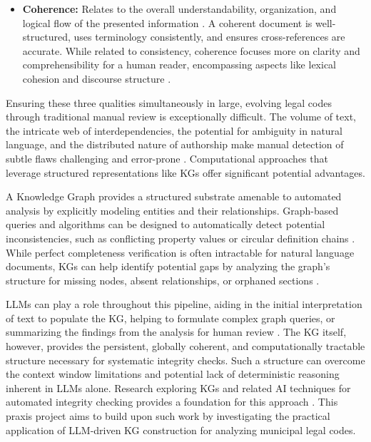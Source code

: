 \begin{itemize}
    \item \textbf{Coherence:} Relates to the overall understandability, organization, and logical flow of the presented information \parencite{RefWorks:RefID:44-wang2014short, RefWorks:RefID:14-shen2021evaluating}. A coherent document is well-structured, uses terminology consistently, and ensures cross-references are accurate. While related to consistency, coherence focuses more on clarity and comprehensibility for a human reader, encompassing aspects like lexical cohesion and discourse structure \parencite{RefWorks:RefID:44-wang2014short}.
\end{itemize}

Ensuring these three qualities simultaneously in large, evolving legal codes through traditional manual review is exceptionally difficult. The volume of text, the intricate web of interdependencies, the potential for ambiguity in natural language, and the distributed nature of authorship make manual detection of subtle flaws challenging and error-prone \parencite{RefWorks:RefID:68-beth2018bills}. Computational approaches that leverage structured representations like KGs offer significant potential advantages.

A Knowledge Graph provides a structured substrate amenable to automated analysis by explicitly modeling entities and their relationships. Graph-based queries and algorithms can be designed to automatically detect potential inconsistencies, such as conflicting property values or circular definition chains \parencite{RefWorks:RefID:77-tauqeer2022automated, RefWorks:RefID:24-brucker2019ontologies, RefWorks:RefID:19-schönberg2011verifying, RefWorks:RefID:23-weitl2006checking}. While perfect completeness verification is often intractable for natural language documents, KGs can help identify potential gaps by analyzing the graph's structure for missing nodes, absent relationships, or orphaned sections \parencite{RefWorks:RefID:151-rabbani2023extraction, RefWorks:RefID:152-rabbani2022shacl, RefWorks:RefID:153-omran2020shacl, RefWorks:RefID:154-knublauch2017shapes, RefWorks:RefID:29-umar2024advances}.

LLMs can play a role throughout this pipeline, aiding in the initial interpretation of text to populate the KG, helping to formulate complex graph queries, or summarizing the findings from the analysis for human review \parencite{RefWorks:RefID:107-benjira2025automated}. The KG itself, however, provides the persistent, globally coherent, and computationally tractable structure necessary for systematic integrity checks. Such a structure can overcome the context window limitations and potential lack of deterministic reasoning inherent in LLMs alone. Research exploring KGs and related AI techniques for automated integrity checking provides a foundation for this approach \parencite{RefWorks:RefID:29-umar2024advances, RefWorks:RefID:21-heitmeyer1996automated, RefWorks:RefID:77-tauqeer2022automated, RefWorks:RefID:76-dhani2021similar, RefWorks:RefID:11-aumiller2021structural}. This praxis project aims to build upon such work by investigating the practical application of LLM-driven KG construction for analyzing municipal legal codes.

